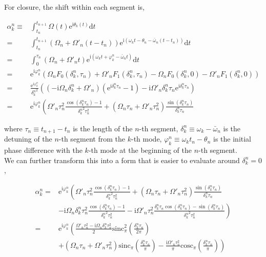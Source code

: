 \documentclass[10pt,fleqn]{article}
\newcommand{\ud}{\mathrm{d}}
\newcommand{\ue}{\mathrm{e}}
\newcommand{\ui}{\mathrm{i}}
\newcommand{\eqar}[1]
{
  \begin{align*}
    #1
  \end{align*}
}
\newcommand{\paren}[1]{{\left({#1}\right)}}
\newcommand{\lparen}[1]{{\left({#1}\right.}}
\newcommand{\rparen}[1]{{\left.{#1}\right)}}
\begin{document}
For closure, the shift within each segment is,
\eqar{
  \alpha_k^n\equiv&\int_{t_n}^{t_{n+1}}\Omega(t)\ue^{\ui\theta_k(t)}\ud t\\
  =&\int_{t_n}^{t_{n+1}}\paren{\Omega_n+\Omega'_n\paren{t-t_n}}\ue^{\ui\paren{\omega_kt-\theta_n-\bar\omega_n\paren{t-t_n}}}\ud t\\
  =&\int_{0}^{\tau_n}\paren{\Omega_n+\Omega'_n t}\ue^{\ui\paren{\omega_kt+\varphi_k^n-\bar\omega_n t}}\ud t\\
  =&\ue^{\ui\varphi_k^n}\paren{\Omega_nF_0(\delta_k^n, \tau_n)+\Omega'_nF_1(\delta_k^n, \tau_n)-\Omega_nF_0(\delta_k^n, 0)-\Omega'_nF_1(\delta_k^n, 0)}\\
  =&\frac{\ue^{\ui\varphi_k^n}}{{\delta_k^n}^2}\paren{
    \paren{-\ui\Omega_n\delta_k^n+\Omega'_n}\paren{\ue^{\ui\delta_k^n\tau_n}-1}
    -\ui\Omega'_n\delta_k^n\tau_n\ue^{\ui\delta_k^n\tau_n}}\\
  =&\ue^{\ui\varphi_k^n}\lparen{
    \Omega'_n\tau_n^2\frac{\cos\paren{\delta_k^n\tau_n}-1}{{\delta_k^n}^2\tau_n^2}
    +\paren{\Omega_n\tau_n+\Omega'_n\tau_n^2}\frac{\sin\paren{\delta_k^n\tau_n}}{\delta_k^n\tau_n}
  }
}
where $\tau_n\equiv t_{n+1}-t_n$ is the length of the $n$-th segment, $\delta_k^n\equiv\omega_k-\bar\omega_n$ is the detuning of the $n$-th segment from the $k$-th mode, $\varphi_k^n\equiv\omega_kt_n-\theta_n$ is the initial phase difference with the $k$-th mode at the beginning of the $n$-th segment.\\

We can further transform this into a form that is easier to evaluate
around $\delta_k^n=0$,
\eqar{
  \alpha_k^n=&\ue^{\ui\varphi_k^n}\lparen{
    \Omega'_n\tau_n^2\frac{\cos\paren{\delta_k^n\tau_n}-1}{{\delta_k^n}^2\tau_n^2}
    +\paren{\Omega_n\tau_n+\Omega'_n\tau_n^2}\frac{\sin\paren{\delta_k^n\tau_n}}{\delta_k^n\tau_n}
  }\\
  &\rparen{
    -\ui\Omega_n\delta_k^n\tau_n^2\frac{\cos\paren{\delta_k^n\tau_n}-1}{{\delta_k^n}^2\tau_n^2}
    -\ui\Omega'_n\tau_n^2\frac{\delta_k^n\tau_n\cos\paren{\delta_k^n\tau_n}-\sin\paren{\delta_k^n\tau_n}}{{\delta_k^n}^2\tau_n^2}
  }\\
  =&\ue^{\ui\varphi_k^n}\lparen{
    \frac{\Omega'_n\tau_n^2-\ui\Omega_n\delta_k^n\tau_n^2}{2}
    \mathrm{sinc}_\pi^2\paren{\frac{\delta_k^n\tau_n}{2\pi}}
  }\\
  &\rparen{
    +\paren{\Omega_n\tau_n+\Omega'_n\tau_n^2}\mathrm{sinc}_\pi\paren{\frac{\delta_k^n\tau_n}{\pi}}
    -\frac{\ui\Omega'_n\tau_n^2}{\pi}\mathrm{cosc}_\pi\paren{\frac{\delta_k^n\tau_n}{\pi}}
  }
}
\end{document}
